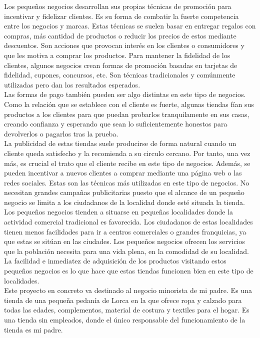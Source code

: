 Los pequeños negocios desarrollan sus propias técnicas de promoción para incentivar y fidelizar clientes. Es su forma de combatir la fuerte competencia entre los negocios y marcas. Estas técnicas se suelen basar en entregar regalos con compras, más cantidad de productos o reducir los precios de estos mediante descuentos. Son acciones que provocan interés en los clientes o consumidores y que les motiva a comprar los productos. 
Para mantener la fidelidad de los clientes, algunos negocios crean formas de promoción basadas en tarjetas de fidelidad, cupones, concursos, etc. Son técnicas tradicionales y comúnmente utilizadas pero dan los resultados esperados. \cite{gago2023dinamizacion} \\

Las formas de pago también pueden ser algo distintas en este tipo de negocios. Como la relación que se establece con el cliente es fuerte, algunas tiendas fían sus productos a los clientes para que puedan probarlos tranquilamente en sus casas, creando confianza y esperando que sean lo suficientemente honestos para devolverlos o pagarlos tras la prueba. \\

La publicidad de estas tiendas suele producirse de forma natural cuando un cliente queda satisfecho y la recomienda a su circulo cercano. Por tanto, una vez más, es crucial el trato que el cliente recibe en este tipo de negocios. Además, se pueden incentivar a nuevos clientes a comprar mediante una página web o las redes sociales. Estas son las técnicas más utilizadas en este tipo de negocios. No necesitan grandes campañas publicitarias puesto que el alcance de un pequeño negocio se limita a los ciudadanos de la localidad donde esté situada la tienda.  \\

Los pequeños negocios tienden a situarse en pequeñas localidades donde la actividad comercial tradicional es favorecida. Los ciudadanos de estas localidades tienen menos facilidades para ir a centros comerciales o grandes franquicias, ya que estas se sitúan en las ciudades. Los pequeños negocios ofrecen los servicios que la población necesita para una vida plena, en la comodidad de su localidad. La facilidad e inmediatez de adquisición de los productos visitando estos pequeños negocios es lo que hace que estas tiendas funcionen bien en este tipo de localidades. \cite{duenas2014calidad} \\


Este proyecto en concreto va destinado al negocio minorista de mi padre. Es una tienda de una pequeña pedanía de Lorca en la que ofrece ropa y calzado para todas las edades, complementos, material de costura y textiles para el hogar. Es una tienda sin empleados, donde el único responsable del funcionamiento de la tienda es mi padre.  

